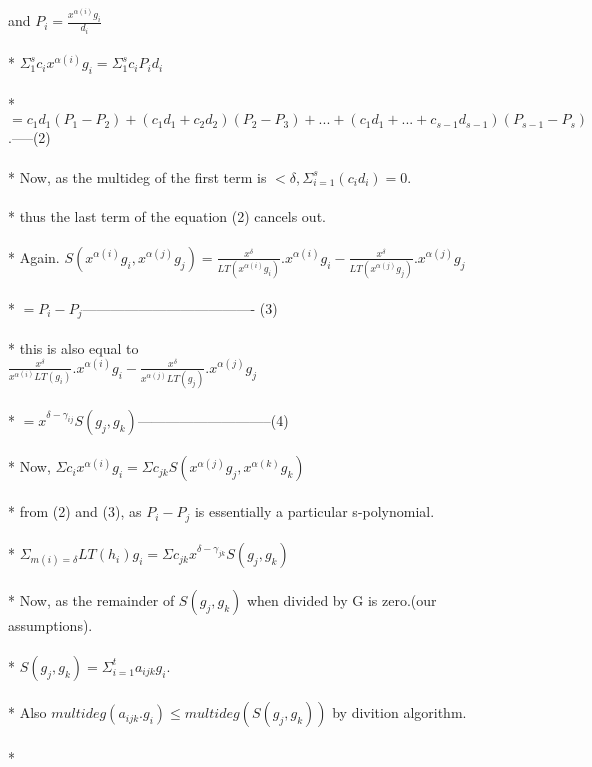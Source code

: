 \documentclass[12pt]{article}
\begin{document}
and $P_{i}=\frac{x^{\alpha(i)}g_{i}}{d_{i}}$\\\\*
$\Sigma_{1}^{s} c_{i}x^{\alpha(i)}g_{i}= \Sigma_{1}^{s} c_{i}P_{i}d_{i}$\\\\*
$=c_{1}d_{1}(P_{1}-P_{2})+(c_{1}d_{1}+c_{2}d_{2})(P_{2}-P_{3})+...+(c_{1}d_{1}+...+c_{s-1}d_{s-1})(P_{s-1}-P_{s})$.-----(2)\\ \\*
Now, as the multideg of the first term is $< \delta , \Sigma^{s}_{i=1}(c_{i}d_{i})=0$.\\\\*
thus the last term of the equation (2) cancels out.\\\\*
Again. $S(x^{\alpha(i)}g_{i},x^{\alpha(j)}g_{j})= \frac{x^{\delta}}{LT(x^{\alpha(i)}g_{i})}.x^{\alpha(i)}g_{i} -\frac{x^{\delta}}{LT(x^{\alpha(j)}g_{j})}.x^{\alpha(j)}g_{j}  $\\\\*
$= P_{i}-P_{j}$------------------------------------- (3)\\\\*
this is also equal to \\
$\frac{x^{\delta}}{x^{\alpha(i)}LT(g_{i})}.x^{\alpha(i)}g_{i} -\frac{x^{\delta}}{x^{\alpha(j)}LT(g_{j})}.x^{\alpha(j)}g_{j} $\\\\*
$=x^{\delta -\gamma_{ij}}S(g_{j},g_{k})$-----------------------------(4)\\\\*
Now, $\Sigma c_{i}x^{\alpha(i)}g_{i} = \Sigma c_{jk} S(x^{\alpha(j)}g_{j},x^{\alpha(k)}g_{k})$\\\\*
from (2) and (3), as $P_{i}-P_{j}$ is essentially a particular s-polynomial.\\\\*
$\Sigma_{m(i)=\delta} LT(h_{i})g_{i} = \Sigma c_{jk} x^{\delta - \gamma_{jk}} S(g_{j},g_{k})$\\\\*
Now, as the remainder of $S(g_{j},g_{k})$ when divided by G is zero.(our assumptions).\\\\*
$S(g_{j},g_{k})= \Sigma_{i=1}^{t} a_{ijk}g_{i}$.\\\\*
Also $ multideg(a_{ijk}.g_{i}) \leq multideg(S(g_{j},g_{k}))$ by divition algorithm.\\\\*
\end{document}
